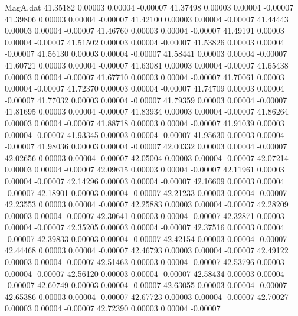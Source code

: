 \begin{filecontents}{MagA.dat}
  41.35182    0.00003    0.00004   -0.00007
  41.37498    0.00003    0.00004   -0.00007
  41.39806    0.00003    0.00004   -0.00007
  41.42100    0.00003    0.00004   -0.00007
  41.44443    0.00003    0.00004   -0.00007
  41.46760    0.00003    0.00004   -0.00007
  41.49191    0.00003    0.00004   -0.00007
  41.51502    0.00003    0.00004   -0.00007
  41.53826    0.00003    0.00004   -0.00007
  41.56130    0.00003    0.00004   -0.00007
  41.58441    0.00003    0.00004   -0.00007
  41.60721    0.00003    0.00004   -0.00007
  41.63081    0.00003    0.00004   -0.00007
  41.65438    0.00003    0.00004   -0.00007
  41.67710    0.00003    0.00004   -0.00007
  41.70061    0.00003    0.00004   -0.00007
  41.72370    0.00003    0.00004   -0.00007
  41.74709    0.00003    0.00004   -0.00007
  41.77032    0.00003    0.00004   -0.00007
  41.79359    0.00003    0.00004   -0.00007
  41.81695    0.00003    0.00004   -0.00007
  41.83934    0.00003    0.00004   -0.00007
  41.86264    0.00003    0.00004   -0.00007
  41.88718    0.00003    0.00004   -0.00007
  41.91039    0.00003    0.00004   -0.00007
  41.93345    0.00003    0.00004   -0.00007
  41.95630    0.00003    0.00004   -0.00007
  41.98036    0.00003    0.00004   -0.00007
  42.00332    0.00003    0.00004   -0.00007
  42.02656    0.00003    0.00004   -0.00007
  42.05004    0.00003    0.00004   -0.00007
  42.07214    0.00003    0.00004   -0.00007
  42.09615    0.00003    0.00004   -0.00007
  42.11961    0.00003    0.00004   -0.00007
  42.14296    0.00003    0.00004   -0.00007
  42.16609    0.00003    0.00004   -0.00007
  42.18901    0.00003    0.00004   -0.00007
  42.21233    0.00003    0.00004   -0.00007
  42.23553    0.00003    0.00004   -0.00007
  42.25883    0.00003    0.00004   -0.00007
  42.28209    0.00003    0.00004   -0.00007
  42.30641    0.00003    0.00004   -0.00007
  42.32871    0.00003    0.00004   -0.00007
  42.35205    0.00003    0.00004   -0.00007
  42.37516    0.00003    0.00004   -0.00007
  42.39833    0.00003    0.00004   -0.00007
  42.42154    0.00003    0.00004   -0.00007
  42.44468    0.00003    0.00004   -0.00007
  42.46793    0.00003    0.00004   -0.00007
  42.49122    0.00003    0.00004   -0.00007
  42.51463    0.00003    0.00004   -0.00007
  42.53796    0.00003    0.00004   -0.00007
  42.56120    0.00003    0.00004   -0.00007
  42.58434    0.00003    0.00004   -0.00007
  42.60749    0.00003    0.00004   -0.00007
  42.63055    0.00003    0.00004   -0.00007
  42.65386    0.00003    0.00004   -0.00007
  42.67723    0.00003    0.00004   -0.00007
  42.70027    0.00003    0.00004   -0.00007
  42.72390    0.00003    0.00004   -0.00007

\end{filecontents}
